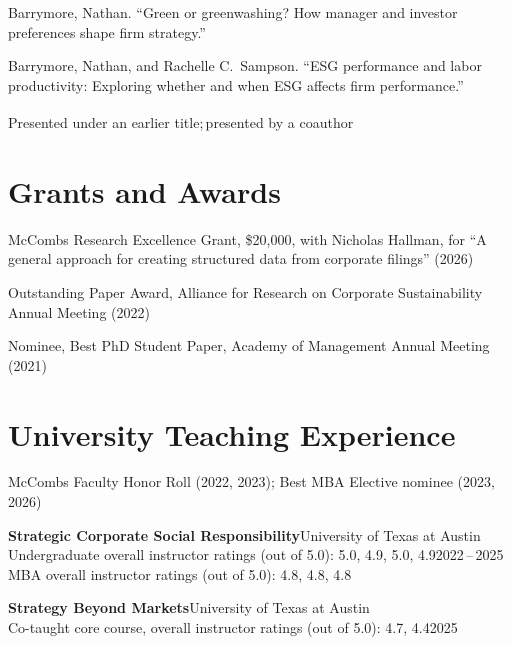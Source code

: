 \documentclass[11pt]{article}
\newcommand{\bib}[1]{#1\par\vspace{6pt}}
\newcommand{\pres}[2]{\needspace{4\baselineskip}\bib{#1}\vspace{-5pt}{\leftskip=0.3in #2\par}\vspace{7pt}}
\begin{document}
\pres{Barrymore, Nathan. ``Green or greenwashing? How manager and investor preferences shape firm
strategy.''}
{Alliance for Research on Corporate Sustainability Annual Meeting (2022), Academy of Management
Annual Meeting (2021), European Group for Organizational Studies, EGOS (2021)}

\pres{Barrymore, Nathan, and Rachelle C.\ Sampson. ``ESG performance and labor productivity:
Exploring whether and when ESG affects firm performance.''}
{Alliance for Research on Corporate Sustainability Annual Meeting (2021), Strategy Science
Conference (2021), Academy of Management Annual Meeting (2021), Strategic Management Society Annual
Conference (2020)}

{\small * Presented under an earlier title;\quad \textsuperscript{\textdagger}\,presented by a
coauthor}

\section*{Grants and Awards}

\bib{McCombs Research Excellence Grant, \$20,000, with Nicholas Hallman, for ``A general approach for
creating structured data from corporate filings'' (2026)}
\bib{Outstanding Paper Award, Alliance for Research on Corporate Sustainability Annual Meeting (2022)}
\bib{Nominee, Best PhD Student Paper, Academy of Management Annual Meeting (2021)}

\section*{University Teaching Experience}

McCombs Faculty Honor Roll (2022, 2023); Best MBA Elective nominee (2023, 2026)\par\vspace{8pt}

\textbf{Strategic Corporate Social Responsibility}\hfill University of Texas at Austin\\
Undergraduate overall instructor ratings (out of 5.0): 5.0, 4.9, 5.0, 4.9\hfill 2022\,--\,2025\\
MBA overall instructor ratings (out of 5.0): 4.8, 4.8, 4.8\par\vspace{7pt}

\textbf{Strategy Beyond Markets}\hfill University of Texas at Austin\\
Co-taught core course, overall instructor ratings (out of 5.0): 4.7, 4.4\hfill 2025\par\vspace{7pt}
\end{document}
